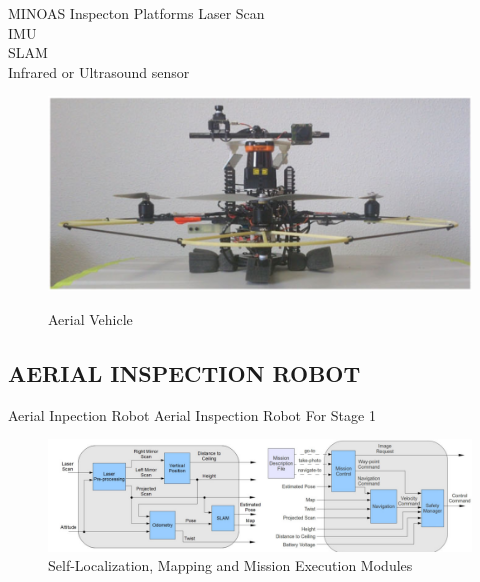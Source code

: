 \documentclass{beamer}
\begin{document}
            \begin{frame}{MINOAS Inspecton Platforms}
                    \centering
                    Laser Scan \\
                    IMU \\
                    SLAM \\
                    Infrared or Ultrasound sensor \\ 
                    \pause                  
                    \begin{figure}[htb]
                        \centering
                        \includegraphics[scale=0.19]{figuras/platform_overview.png}                   
                        \label{}
                        \caption{Aerial Vehicle}
                    \end{figure}
            \end{frame}

        \subsection{AERIAL INSPECTION ROBOT}

            \begin{frame}{Aerial Inpection Robot}
                \centering
                Aerial Inspection Robot For Stage 1                
                    \begin{figure}[htb]
                        \centering
                        \includegraphics[scale=0.23]{figuras/self-localization.png}                   
                        \label{}
                        Self-Localization, Mapping and Mission Execution Modules
                    \end{figure} 
            \end{frame}
\end{document}
